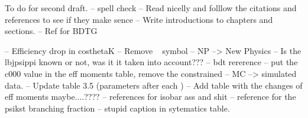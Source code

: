 To do for second draft.
-- spell check
-- Read nicelly and folllow the citations and references to see if they make sence
-- Write introductions to chapters and sections.
-- Ref for BDTG

-- Efficiency drop in costhetaK
-- Remove ~ symbol
-- NP --> New Physics
-- Is the lbjpsippi known or not, was it it taken into account???
-- bdt rererence
-- put the c000 value in the eff moments table, remove the constrained
-- MC --> simulated data.
-- Update table 3.5 (parameters after each )
-- Add table with the changes of eff moments maybe....????
-- references for isobar ass and shit
-- reference for the psikst branching fraction
-- stupid caption in sytematics table.
